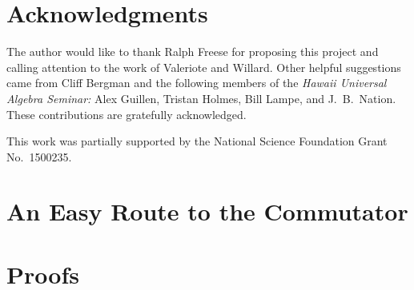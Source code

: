 \section*{Acknowledgments}
The author would like to thank
Ralph Freese for proposing this project and calling attention to
the work of Valeriote and Willard.
Other helpful suggestions came from Cliff Bergman and the
following members of the {\it Hawaii Universal Algebra
Seminar:} Alex Guillen, Tristan Holmes, Bill Lampe, and J.~B.~Nation.
These contributions are gratefully acknowledged.

This work was partially supported by the National Science
Foundation Grant No.~1500235.



\appendix



\section{An Easy Route to the Commutator}
\label{sec:interlude:-an-easy}





\section{Proofs}
\label{sec:proofs}

